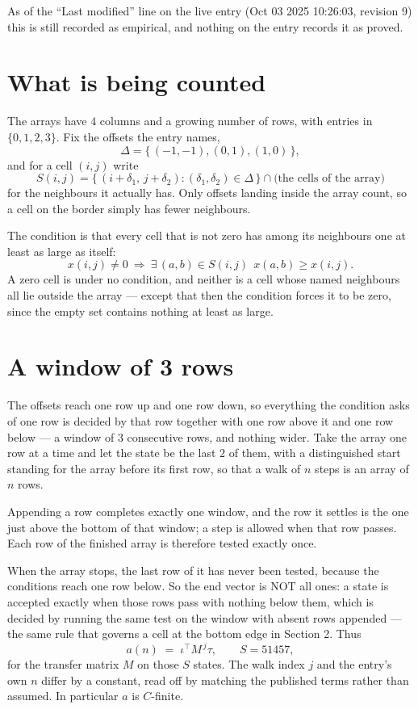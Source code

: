 \documentclass[11pt,a4paper]{article}
\theoremstyle{plain}
\theoremstyle{definition}
\begin{document}
As of the ``Last modified'' line on the live entry (Oct 03 2025 10:26:03, revision 9) this is still
recorded as empirical, and nothing on the entry records it as proved.

\section{What is being counted}

The arrays have $4$ columns and a growing number of rows, with entries in $\{0,1,2,3\}$. Fix the
offsets the entry names,
\[
\Delta=\{\,(-1,-1), (0,1), (1,0)\,\},
\]
and for a cell $(i,j)$ write
\[
S(i,j)=\{\,(i+\delta_1,\,j+\delta_2) : (\delta_1,\delta_2)\in\Delta\,\}\cap
\text{(the cells of the array)}
\]
for the neighbours it actually has. Only offsets landing inside the array count, so a cell on
the border simply has fewer neighbours.

The condition is that every cell that is not zero has among its neighbours one at least as large as itself:
\[
x(i,j)\neq0\ \Longrightarrow\ \exists\,(a,b)\in S(i,j)\ \ x(a,b)\ge x(i,j).
\]
A zero cell is under no condition, and neither is a cell whose named neighbours all lie outside the array --- except that then the condition forces it to be zero, since the empty set contains nothing at least as large.

\section{A window of 3 rows}

The offsets reach one row up and one row down, so everything the condition asks of one row is
decided by that row together with one row above it and one row below --- a window of
$3$ consecutive rows, and nothing wider. Take the array one row at a time and
let the state be the last 2 of them, with a distinguished start standing for the array before its
first row, so that a walk of $n$ steps is an array of $n$ rows.

Appending a row completes exactly one window, and the row it settles is the one just above the bottom of that window; a step is
allowed when that row passes. Each row of the finished array is therefore tested exactly once.

When the array stops, the last row of it has never been tested, because the
conditions reach one row below. So the end vector is NOT all ones: a state is accepted exactly when
those rows pass with nothing below them, which is decided by running the same test on the window
with absent rows appended --- the same rule that governs a cell at the bottom edge in
Section 2.
Thus
\[
a(n)\;=\;\iota^{\!\top}M^{\,j}\tau ,\qquad S=51457,
\]
for the transfer matrix $M$ on those $S$ states. The walk index $j$ and the entry's own $n$
differ by a constant, read off by matching the published terms rather than assumed. In
particular $a$ is $C$-finite.
\end{document}
